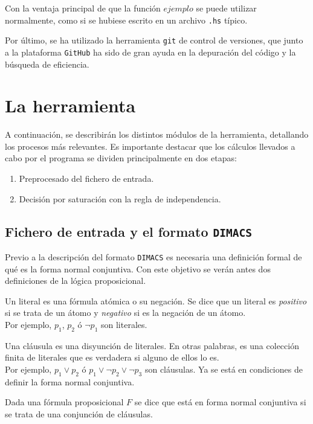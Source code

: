 Con la ventaja principal de que la función $ejemplo$ se puede utilizar normalmente, como si se hubiese escrito en un archivo \texttt{.hs} típico.

Por último, se ha utilizado la herramienta \texttt{git} de control de versiones, que junto a la plataforma \texttt{GitHub} ha sido de gran ayuda en la depuración del código y la búsqueda de eficiencia.

\section{La herramienta}
A continuación, se describirán los distintos módulos de la herramienta, detallando los procesos más relevantes. Es importante destacar que los cálculos llevados a cabo por el programa se dividen principalmente en dos etapas:
\begin{enumerate}
\item Preprocesado del fichero de entrada.
\item Decisión por saturación con la regla de independencia.
\end{enumerate}

\subsection{Fichero de entrada y el formato \texttt{DIMACS}}
Previo a la descripción del formato \texttt{DIMACS} es necesaria una definición formal de qué es la forma normal conjuntiva. Con este objetivo se verán antes dos definiciones de la lógica proposicional.

 Un literal es una fórmula atómica o su negación. Se dice que un literal es \textit{positivo} si se trata de un átomo y \textit{negativo} si es la negación de un átomo.\\

Por ejemplo, $p_1$, $p_2$ ó $\neg p_1$ son literales.

 Una cláusula es una disyunción de literales. En otras palabras, es una colección finita de literales que es verdadera si alguno de ellos lo es. \\

Por ejemplo, $p_1 \vee p_2$ ó $p_1 \vee \neg p_2 \vee \neg p_3$ son cláusulas. Ya se está en condiciones de definir la forma normal conjuntiva.

 Dada una fórmula proposicional $F$ se dice que está en forma normal conjuntiva si se trata de una conjunción de cláusulas. \\

